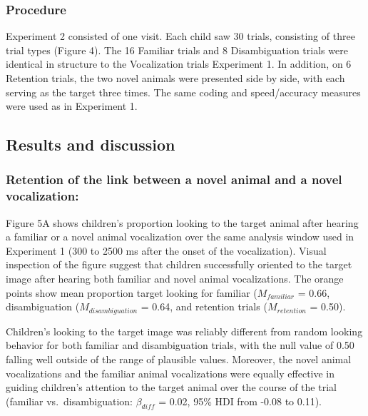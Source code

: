 \documentclass[english,floatsintext,man]{apa6}
\theoremstyle{definition}
\theoremstyle{definition}
\theoremstyle{definition}
\theoremstyle{remark}
\begin{document}
\hypertarget{procedure-1}{%
\subsubsection{Procedure}\label{procedure-1}}

Experiment 2 consisted of one visit. Each child saw 30 trials,
consisting of three trial types (Figure 4). The 16 Familiar trials and 8
Disambiguation trials were identical in structure to the Vocalization
trials Experiment 1. In addition, on 6 Retention trials, the two novel
animals were presented side by side, with each serving as the target
three times. The same coding and speed/accuracy measures were used as in
Experiment 1.

\hypertarget{results-and-discussion-1}{%
\subsection{Results and discussion}\label{results-and-discussion-1}}

\hypertarget{retention-of-the-link-between-a-novel-animal-and-a-novel-vocalization}{%
\subsubsection{Retention of the link between a novel animal and a novel
vocalization:}\label{retention-of-the-link-between-a-novel-animal-and-a-novel-vocalization}}

Figure 5A shows children's proportion looking to the target animal after
hearing a familiar or a novel animal vocalization over the same analysis
window used in Experiment 1 (300 to 2500 ms after the onset of the
vocalization). Visual inspection of the figure suggest that children
successfully oriented to the target image after hearing both familiar
and novel animal vocalizations. The orange points show mean proportion
target looking for familiar (\(M_{familiar}\) = 0.66, disambiguation
(\(M_{disambiguation}\) = 0.64, and retention trials (\(M_{retention}\)
= 0.50).

Children's looking to the target image was reliably different from
random looking behavior for both familiar and disambiguation trials,
with the null value of 0.50 falling well outside of the range of
plausible values. Moreover, the novel animal vocalizations and the
familiar animal vocalizations were equally effective in guiding
children's attention to the target animal over the course of the trial
(familiar vs.~disambiguation: \(\beta_{diff}\) = 0.02, 95\% HDI from
-0.08 to 0.11).
\end{document}
